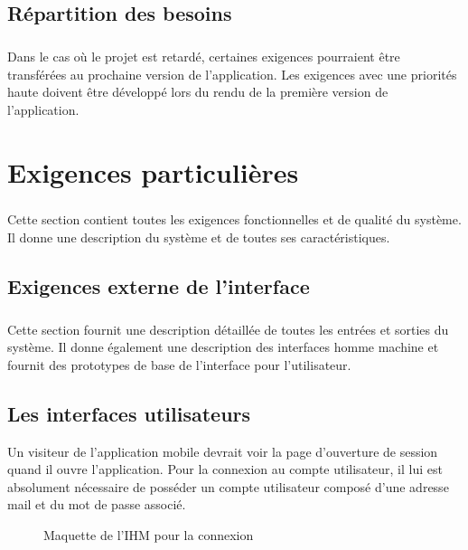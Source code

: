 \documentclass[titlepage, 12pt]{report}
\begin{document}
\section{Répartition des besoins}

\paragraph{}Dans le cas où le projet est retardé, certaines exigences pourraient être transférées au prochaine version de l'application. Les exigences avec une priorités haute doivent être développé lors du rendu de la première version de l'application.

\chapter{Exigences particulières}

\paragraph{}Cette section contient toutes les exigences fonctionnelles et de qualité du système. Il donne une description du système et de toutes ses caractéristiques.

\section{Exigences externe de l'interface}

\paragraph{}Cette section fournit une description détaillée de toutes les entrées et sorties du système. Il donne également une description des interfaces homme machine et fournit des prototypes de base de l'interface pour l'utilisateur.

\section{Les interfaces utilisateurs}

Un visiteur de l'application mobile devrait voir la page d'ouverture de session quand il ouvre l'application. Pour la connexion au compte utilisateur, il lui est absolument nécessaire de posséder un compte utilisateur composé d'une adresse mail et du mot de passe associé.

\begin{figure}[!h]
	\caption{Maquette de l'IHM pour la connexion}
	\label{login}
	\centering
\end{figure}
\end{document}
